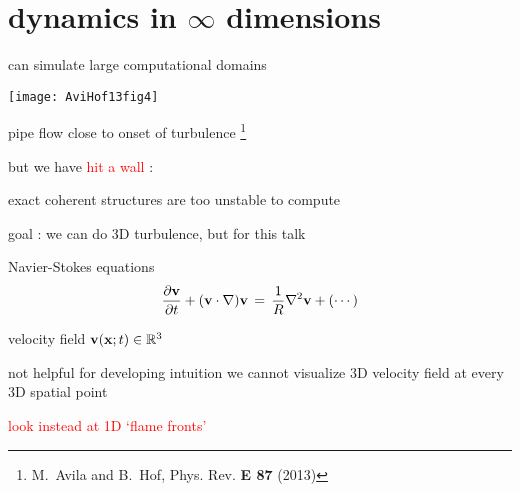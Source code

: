 %
%
%
%
%
%
%
%

\section[dynamics in $\infty$ dimensions]
{dynamics in $\infty$ dimensions}

\begin{frame}{can simulate {\Huge large} computational domains}
\begin{center}
\texttt{[image: AviHof13fig4]}
\end{center}
pipe flow close to onset of turbulence
\footnote{M.~Avila and B.~Hof, {Phys. Rev. \bf E 87} (2013)}

\bigskip

but we have \textcolor{red}{\Huge hit a wall} :

\hfill exact coherent structures are too unstable to compute
\end{frame}

\begin{frame}{goal : we can do 3D turbulence, but for this talk}
\begin{block}{Navier-Stokes equations} %
\[
\dfrac{\partial {\bf v}}{\partial t} + ({\bf v} \cdot \nabla) {\bf v}
	\,=\,
\frac{1}{R} \nabla ^2 {\bf v} + (\cdots)
\]
\end{block}

\hfill{\small velocity field  ${\bf v}({\bf x};t) \in \mathbb{R}^3$}

\medskip

\begin{block}{not helpful for developing intuition}
we cannot visualize 3D velocity field at every 3D spatial point
\end{block}

\bigskip

\hfill {\Large\textcolor{red}{look instead at 1D `flame fronts'}}
\end{frame}

